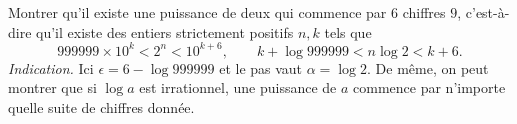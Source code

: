 Montrer qu'il existe une puissance de deux qui commence par $6$ chiffres $9$, c'est-à-dire qu'il existe des entiers strictement positifs $n, k$ tels que
\[ 999999 \times 10^k < 2^n < 10^{k+6},\qquad k + \log 999999 < n\log 2 < k + 6. \]
\emph{Indication.} Ici $\epsilon = 6 - \log 999999$ et le pas vaut $\alpha = \log 2$. De même, on peut montrer que si $\log a$ est irrationnel, une puissance de $a$ commence par n'importe quelle suite de chiffres donnée.
